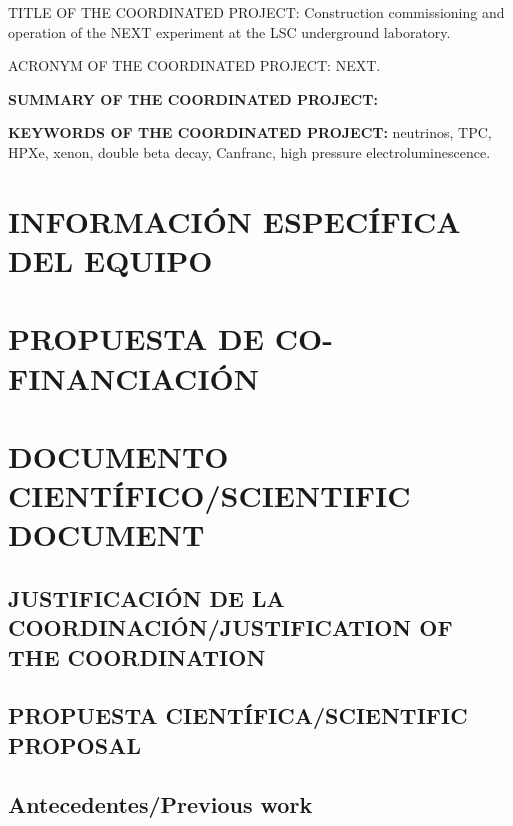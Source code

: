 \documentclass[a4paper,11pt,oneside]{article}
\begin{document}
 \vspace{0.6cm}
{\sc TITLE OF THE COORDINATED PROJECT:} Construction commissioning and operation of the NEXT experiment at the LSC underground laboratory. 
\vspace{0.3cm}

{\sc ACRONYM OF THE COORDINATED PROJECT:} NEXT.
\vspace{0.3cm}

{\bf SUMMARY OF THE COORDINATED PROJECT:} 
\vspace{0.3cm}



 \vspace{0.3cm}

{\bf KEYWORDS OF THE COORDINATED PROJECT:} neutrinos, TPC, HPXe, xenon, double beta decay, Canfranc, high pressure electroluminescence. 

\section{INFORMACIÓN ESPECÍFICA DEL EQUIPO}
\newpage

\section{PROPUESTA DE CO-FINANCIACIÓN}



\section{\bf DOCUMENTO CIENTÍFICO/SCIENTIFIC DOCUMENT}

\subsection{\sc JUSTIFICACIÓN DE LA COORDINACIÓN/JUSTIFICATION OF THE COORDINATION}
\vspace{0.3cm}



\subsection{\bf PROPUESTA CIENTÍFICA/SCIENTIFIC PROPOSAL}



\subsection*{\sc Antecedentes/Previous work}
\end{document}
